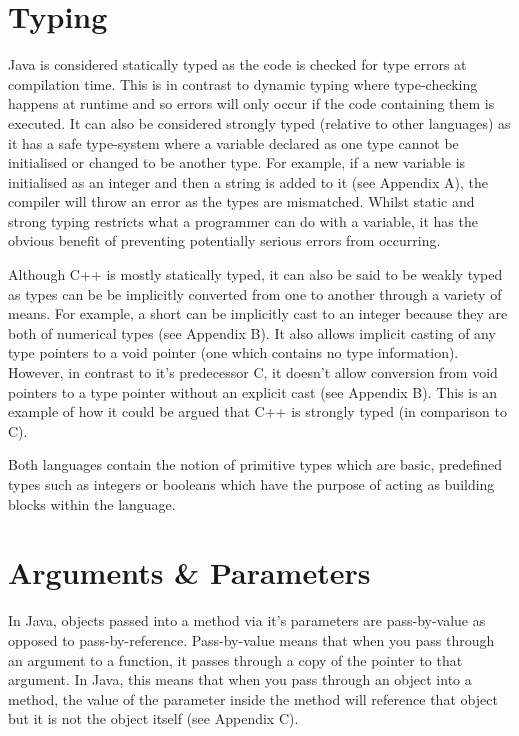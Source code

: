 \documentclass[]{report}
\begin{document}
\section{Typing}
Java is considered statically typed as the code is checked for type errors at compilation time. This is in contrast to dynamic typing where type-checking happens at runtime and so errors will only occur if the code containing them is executed. It can also be considered strongly typed (relative to other languages) as it has a safe type-system where a variable declared as one type cannot be initialised or changed to be another type. For example, if a new variable is initialised as an integer and then a string is added to it (see Appendix A), the compiler will throw an error as the types are mismatched. Whilst static and strong typing restricts what a programmer can do with a variable, it has the obvious benefit of preventing potentially serious errors from occurring.\cite{TypingJava}	

Although C++ is mostly statically typed, it can also be said to be weakly typed as types can be be implicitly converted from one to another through a variety of means. For example, a short can be implicitly cast to an integer because they are both of numerical types (see Appendix B). It also allows implicit casting of any type pointers to a void pointer (one which contains no type information). However, in contrast to it's predecessor C, it doesn't allow conversion from void pointers to a type pointer without an explicit cast (see Appendix B). This is an example of how it could be argued that C++ is strongly typed (in comparison to C). \cite{TypingC++}

Both languages contain the notion of primitive types which are basic, predefined types such as integers or booleans which have the purpose of acting as building blocks within the language.

\section{Arguments \& Parameters}
In Java, objects passed into a method via it's parameters are pass-by-value as opposed to pass-by-reference. Pass-by-value means that when you pass through an argument to a function, it passes through a copy of the pointer to that argument. In Java, this means that when you pass through an object into a method, the value of the parameter inside the method will reference that object but it is not the object itself (see Appendix C). \cite{ParametersJava}
\end{document}
